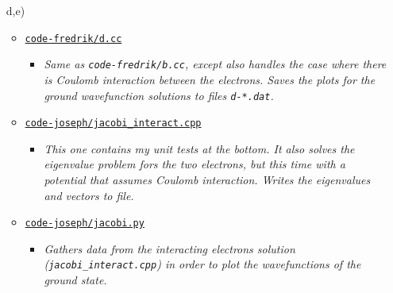 \documentclass[11pt,a4paper]{article}
\begin{document}
\begin{enumerate}
  \item[d,e)]
  \begin{itemize}
    \item \href{https://github.com/frxstrem/fys3150/tree/master/project2/code-fredrik/d.cc}{\tt code-fredrik/d.cc}
    \begin{itemize}
      \item {\it Same as \texttt{code-fredrik/b.cc}, except also handles the case where there is Coulomb interaction between the electrons. Saves the plots for the ground wavefunction solutions to files \texttt{d-*.dat}.}
    \end{itemize}
    \item \href{https://github.com/frxstrem/fys3150/tree/master/project2/code-joseph/jacobi_interact.cpp}{\tt code-joseph/jacobi\_interact.cpp}
    \begin{itemize}
      \item {\it This one contains my unit tests at the bottom. It also solves the eigenvalue problem fors the two electrons, but this time with a potential that assumes Coulomb interaction. Writes the eigenvalues and vectors to file.}
    \end{itemize}
    \item \href{https://github.com/frxstrem/fys3150/tree/master/project2/code-joseph/jacobi.py}{\tt code-joseph/jacobi.py}
    \begin{itemize}
      \item {\it Gathers data from the interacting electrons solution (\texttt{jacobi\_interact.cpp}) in order to plot the wavefunctions of the ground state.}
    \end{itemize}
  \end{itemize}
\end{enumerate}

\clearpage

\printbibliography[heading=bibnumbered,title=Bibliography]
\end{document}
